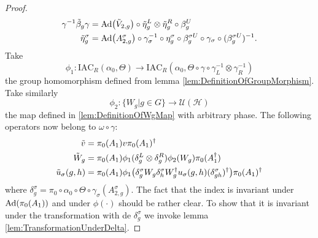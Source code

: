 \documentclass[12pt,a4paper,twoside]{article}
\let\originalleft\left
\let\originalright\right
\renewcommand{\left}{\mathopen{}\mathclose\bgroup\originalleft}
\renewcommand{\right}{\aftergroup\egroup\originalright}
\newcommand{\UU}{\mathcal U}
\newcommand{\HH}{\mathcal H}
\newcommand{\Ad}[1]{\textrm{Ad}\left(#1\right)}
\theoremstyle{definition}
\numberwithin{equation}{section}
\begin{document}
\begin{proof}
\begin{align}
		\gamma^{-1}\tilde{\beta}_g\gamma&=\Ad{\tilde V_{2,g}}\circ\tilde{\eta}_g^L\otimes\tilde{\eta}_g^R\circ\beta_g^U\\
	\tilde{\eta}_g^\sigma&=\Ad{A_{2,g}^\sigma}\circ\gamma_{\sigma}^{-1}\circ\eta_g^\sigma\circ\beta_g^{\sigma U}\circ\gamma_{\sigma}\circ(\beta_g^{\sigma U})^{-1}.
	\end{align}
	Take
	\begin{equation}
		\phi_1:\textrm{IAC}_R(\alpha_0,\Theta) \rightarrow \textrm{IAC}_R(\alpha_0,\Theta\circ \gamma \circ \gamma_L^{-1}\otimes\gamma_R^{-1})
	\end{equation}
	the group homomorphism defined from lemma \ref{lem:DefinitionOfGroupMorphism}. Take similarly
	\begin{equation}
		\phi_2:\{W_g|g\in G\}\rightarrow \UU(\HH)
	\end{equation}
	the map defined in \ref{lem:DefinitionOfWgMap} with arbitrary phase. The following operators now belong to $\omega\circ\gamma:$
	\begin{align}
		\tilde{v}&=\pi_0(A_1)v\pi_0(A_1)^\dagger\\
		\tilde{W}_g&=\pi_0(A_1)\phi_1(\delta^L_g\otimes\delta^R_g)\phi_2( W_g)\pi_0(A_1^\dagger)\\
		\tilde u_\sigma(g,h)&=\pi_0(A_1) \phi_1\left(\delta^\sigma_g W_g\delta^\sigma_h W_g^\dagger u_\sigma(g,h)(\delta^\sigma_{gh})^\dagger\right)\pi_0(A_1)^\dagger
	\end{align}
	where $\delta^\sigma_g=\pi_0\circ\alpha_0\circ\Theta\circ\gamma_{\sigma}(A^\sigma_{2,g}).$ The fact that the index is invariant under $\Ad{\pi_0(A_1)}$ and under $\phi(\cdot)$ should be rather clear. To show that it is invariant under the transformation with de $\delta^\sigma_g$ we invoke lemma \ref{lem:TransformationUnderDelta}.
\end{proof}
\appendix
\end{document}
